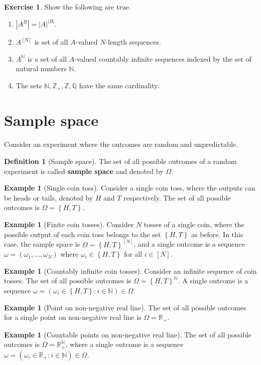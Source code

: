 \documentclass[letterpaper,10pt,english]{article}
\theoremstyle{plain}
\theoremstyle{definition}
\newtheorem{defn}[thm]{Definition}
\newtheorem{exmp}[thm]{Example}
\newtheorem{exerc}[thm]{Exercise}
\theoremstyle{remark}
\newcommand{\abs}[1]{\left\lvert#1\right\rvert}
\newcommand{\set}[1]{\left\{#1\right\}}
\newcommand{\N}{\mathbb{N}}
\newcommand{\Q}{\mathbb{Q}}
\newcommand{\R}{\mathbb{R}}
\newcommand{\Z}{\mathbb{Z}}
\begin{document}
\begin{tcolorbox}
\begin{exerc}
Show the following are true. 
\begin{enumerate}
\item $\abs{A^B} = \abs{A}^{\abs{B}}$. 
\item $A^{[N]}$ is set of all $A$-valued $N$-length sequences. 
\item $A^\N$ is a set of all $A$-valued countably infinite sequences indexed by the set of natural numbers $\N$.
\item The sets $\N, \Z_+, \Z, \Q$ have the same cardinality. 
\end{enumerate}
\end{exerc}
\end{tcolorbox}
\section{Sample space}

Consider an experiment where the outcomes are random and unpredictable. 
\begin{defn}[Sample space]
The set of all possible outcomes of a random experiment is called \textbf{sample space} and denoted by $\Omega$. 
\end{defn}
\begin{shaded}
\begin{exmp}[Single coin toss] 
Consider a single coin toss, where the outputs can be heads or tails, denoted by $H$ and $T$ respectively.  
The set of all possible outcomes is $\Omega = \set{H, T}$.
\end{exmp}
\begin{exmp}[Finite coin tosses] 
Consider $N$ tosses of a single coin, where the possible output of each coin toss belongs to the set $\set{H,T}$ as before.  
In this case, the sample space is $\Omega = \set{H, T}^{[N]}$, 
and a single outcome is a sequence $\omega = (\omega_1, \dots, \omega_N)$ where $\omega_i \in \set{H,T}$ for all $i \in [N]$.  
\end{exmp}
\begin{exmp}[Countably infinite coin tosses] 
Consider an infinite sequence of coin tosses. 
The set of all possible outcomes is $\Omega = \set{H, T}^\N$. 
A single outcome is a sequence $\omega = (\omega_i \in \set{H,T}: i \in \N) \in \Omega$.  
\end{exmp}
\begin{exmp}[Point on non-negative real line] 
The set of all possible outcomes for a single point on non-negative real line is $\Omega = \R_+$. 
\end{exmp}
\begin{exmp}[Countable points on non-negative real line]
The set of all possible outcomes is $\Omega = \R_+^\N$, 
where a single outcome is a sequence $\omega = (\omega_i \in \R_+: i \in \N) \in \Omega$. 
\end{exmp}
\end{shaded}
\end{document}
